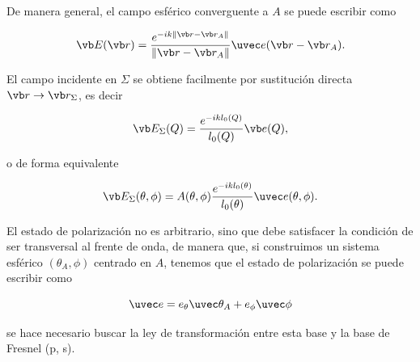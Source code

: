 De manera general, el campo esférico converguente a $A$ se puede escribir como 

\begin{equation}
    \vb E (\vb r) = \frac{e^{-ik \lVert \vb r - \vb r_A \rVert}}{\lVert \vb r - \vb r_A \rVert} \uvec e (\vb r - \vb r_A).
    \label{eq:spherical_incident_field}
\end{equation}

El campo incidente en $\Sigma$ se obtiene facilmente por sustitución directa $\vb r \rightarrow \vb r_\Sigma$, es decir 

\begin{equation}
    \vb E_{\Sigma} (Q) =  \frac{e^{-ik l_0(Q)}}{l_0(Q)} \vb e(Q),
\end{equation}

o de forma equivalente 

\begin{equation}
    \vb E_{\Sigma} (\theta, \phi) = A(\theta, \phi) \frac{e^{-ik l_0(\theta)}}{l_0(\theta)} \uvec e (\theta, \phi).
\end{equation}

El estado de polarización no es arbitrario, sino que debe satisfacer la condición de ser transversal al frente de onda, de manera que, si construimos un sistema esférico $(\theta_A, \phi)$ centrado en $A$, tenemos que el estado de polarización se puede escribir como

\begin{equation}
   \uvec e = e_\theta \uvec \theta_A + e_\phi \uvec \phi 
\end{equation}


se hace necesario buscar la ley de transformación entre esta base y la base de Fresnel (p, s).


